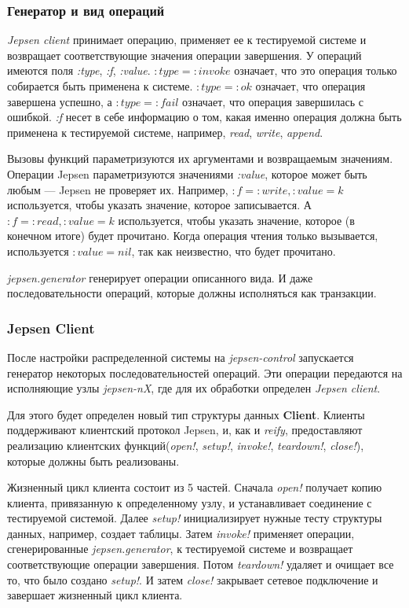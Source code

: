 \documentclass[14pt,  openany]{book}
\begin{document}
\subsubsection{Генератор и вид операций}
\textit{Jepsen client} принимает операцию, применяет ее к тестируемой системе и возвращает соответствующие значения операции завершения.  У операций имеются поля \textit{:type}, \textit{:f}, \textit{:value}.  $:type=:invoke$ означает, что это операция только собирается быть применена к системе.  $:type=:ok$ означает, что операция завершена успешно, а $:type=:fail$ означает, что операция завершилась с ошибкой.  \textit{:f} несет в себе информацию о том, какая именно операция должна быть применена к тестируемой системе, например, \textit{read}, \textit{write}, \textit{append}.
\par Вызовы функций параметризуются их аргументами и возвращаемым значениям. Операции Jepsen параметризуются значениями \textit{:value}, которое может быть любым --- Jepsen не проверяет их. Например,  $:f=:write, :value=k$ используется, чтобы указать значение, которое записывается. А $:f=:read, :value=k$ используется, чтобы указать значение, которое (в конечном итоге) будет прочитано. Когда операция чтения только вызывается,  используется $:value = nil$, так как неизвестно, что будет прочитано.
\par \textit{jepsen.generator} генерирует операции описанного вида. И даже последовательности операций, которые должны исполняться как транзакции. 

\subsubsection{Jepsen Client}
После настройки распределенной системы на \textit{jepsen-control}  запускается генератор некоторых последовательностей операций.  Эти операции передаются на исполняющие узлы \textit{jepsen-nX}, где для их обработки определен \textit{Jepsen client}. 
\par Для этого будет определен новый тип структуры данных \textbf{Client}.  Клиенты поддерживают клиентский протокол Jepsen, и, как и \textit{reify}, предоставляют реализацию клиентских функций(\textit{open!}, \textit{setup!}, \textit{invoke!}, \textit{teardown!}, \textit{close!}), которые должны быть реализованы.  
\par Жизненный цикл клиента состоит из 5 частей. Сначала \textit{open!} получает копию клиента, привязанную к определенному узлу, и устанавливает соединение с тестируемой системой. Далее \textit{setup!} инициализирует нужные тесту структуры данных, например, создает таблицы. Затем \textit{invoke!} применяет операции, сгенерированные \textit{jepsen.generator}, к тестируемой системе и возвращает соответствующие операции завершения. Потом \textit{teardown!} удаляет и очищает все то, что было создано \textit{setup!}. И затем \textit{close!} закрывает сетевое подключение и завершает жизненный цикл клиента.
\end{document}

